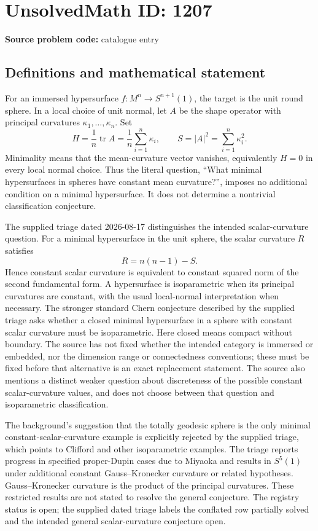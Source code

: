 \documentclass[11pt]{article}
\begin{document}
\section*{UnsolvedMath ID: 1207}
\textbf{Source problem code:} catalogue entry
\subsection{Definitions and mathematical statement}
For an immersed hypersurface \(f:M^n\to S^{n+1}(1)\), the target is the unit round sphere. In a local choice of unit normal, let \(A\) be the shape operator with principal curvatures \(\kappa_1,\ldots,\kappa_n\). Set
\[
H=\frac1n\operatorname{tr}A=\frac1n\sum_{i=1}^n\kappa_i,
\qquad S=|A|^2=\sum_{i=1}^n\kappa_i^2.
\]
Minimality means that the mean-curvature vector vanishes, equivalently \(H=0\) in every local normal choice. Thus the literal question, ``What minimal hypersurfaces in spheres have constant mean curvature?'', imposes no additional condition on a minimal hypersurface. It does not determine a nontrivial classification conjecture.

The supplied triage dated 2026-08-17 distinguishes the intended scalar-curvature question. For a minimal hypersurface in the unit sphere, the scalar curvature \(R\) satisfies
\[
R=n(n-1)-S.
\]
Hence constant scalar curvature is equivalent to constant squared norm of the second fundamental form. A hypersurface is isoparametric when its principal curvatures are constant, with the usual local-normal interpretation when necessary. The stronger standard Chern conjecture described by the supplied triage asks whether a closed minimal hypersurface in a sphere with constant scalar curvature must be isoparametric. Here closed means compact without boundary. The source has not fixed whether the intended category is immersed or embedded, nor the dimension range or connectedness conventions; these must be fixed before that alternative is an exact replacement statement. The source also mentions a distinct weaker question about discreteness of the possible constant scalar-curvature values, and does not choose between that question and isoparametric classification.

The background's suggestion that the totally geodesic sphere is the only minimal constant-scalar-curvature example is explicitly rejected by the supplied triage, which points to Clifford and other isoparametric examples. The triage reports progress in specified proper-Dupin cases due to Miyaoka and results in \(S^5(1)\) under additional constant Gauss--Kronecker curvature or related hypotheses. Gauss--Kronecker curvature is the product of the principal curvatures. These restricted results are not stated to resolve the general conjecture. The registry status is open; the supplied dated triage labels the conflated row partially solved and the intended general scalar-curvature conjecture open.
\end{document}
